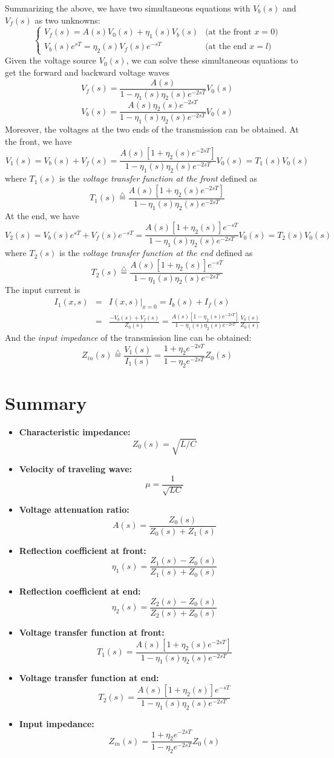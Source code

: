 Summarizing the above, we have two simultaneous equations with 
$V_b(s)$ and $V_f(s)$ as two unknowns:
\[ \left\{ \begin{array}{ll}
V_f(s)=A(s)V_0(s)+\eta_1(s)V_b(s) & \mbox{(at the front $x=0$)} \\
V_b(s)e^{sT}=\eta_2(s)V_f(s)e^{-sT} & \mbox{(at the end $x=l$)}
	\end{array} \right. \]
Given the voltage source $V_0(s)$, we can solve these simultaneous
equations to get the forward and backward voltage waves
\[ V_f(s)=\frac{A(s)}{1-\eta_1(s)\eta_2(s)e^{-2sT}}V_0(s) \]
\[ V_b(s)=\frac{A(s)\eta_2(s)e^{-2sT}}{1-\eta_1(s)\eta_2(s)e^{-2sT}}V_0(s) \]
Moreover, the voltages at the two ends of the transmission can be 
obtained. At the front, we have
\[ V_1(s)=V_b(s)+V_f(s)=\frac{A(s)[1+\eta_2(s)e^{-2sT}]}{1-\eta_1(s)\eta_2(s)e^{-2sT}}V_0(s) = T_1(s)V_0(s) \]
where $T_1(s)$ is the {\em voltage transfer function at the front} 
defined as
\[ T_1(s)\stackrel{\triangle}{=}\frac{A(s)[1+\eta_2(s)e^{-2sT}]}{1-\eta_1(s)\eta_2(s)e^{-2sT}}	\]
At the end, we have
\[  V_2(s)=V_b(s)e^{sT}+V_f(s)e^{-sT}=\frac{A(s)[1+\eta_2(s)]e^{-sT}}{1-\eta_1(s)\eta_2(s)e^{-2sT}}V_0(s) = T_2(s)V_0(s) \]
where $T_2(s)$ is the {\em voltage transfer function at the end} 
defined as
\[ T_2(s)\stackrel{\triangle}{=}\frac{A(s)[1+\eta_2(s)]e^{-sT}}{1-\eta_1(s)\eta_2(s)e^{-2sT}}	\]
The input current is
\begin{eqnarray}
I_1(x,s) &=& I(x,s)|_{x=0}=I_b(s)+I_f(s)
	\nonumber \\
 & = &\frac{-V_b(s)+V_f(s)}{Z_0(s)}=\frac{A(s)[1-\eta_2(s)e^{-2sT}]}{1-\eta_1(s)\eta_2(s)e^{-2sT}}
	\frac{V_0(s)}{Z_0(s)}	\nonumber 
\end{eqnarray}
And the {\em input impedance} of the transmission line can be 
obtained:
\[
Z_{in}(s)\stackrel{\triangle}{=}\frac{V_1(s)}{I_1(s)}=\frac{1+\eta_2e^{-2sT}}{1-\eta_2e^{-2sT}}
Z_0(s) \]

\newpage
{\large
\section*{Summary}
\begin{itemize}
\item {\bf Characteristic impedance:}
\[	Z_0(s)=\sqrt{L/C}	\]
\item {\bf Velocity of traveling wave:}
\[	\mu = \frac{1}{\sqrt{LC}}	\]
\item {\bf Voltage attenuation ratio:}
\[ A(s)=\frac{Z_0(s)}{Z_0(s)+Z_1(s)}	\]
\item {\bf Reflection coefficient at front:}
\[ \eta_1(s)=\frac{Z_1(s)-Z_0(s)}{Z_1(s)+Z_0(s)} \]
\item {\bf Reflection coefficient at end:}
\[ \eta_2(s)=\frac{Z_2(s)-Z_0(s)}{Z_2(s)+Z_0(s)} \]
\item {\bf Voltage transfer function at front:}
\[ T_1(s)=\frac{A(s)[1+\eta_2(s)e^{-2sT}]}{1-\eta_1(s)\eta_2(s)e^{-2sT}} \]
\item {\bf Voltage transfer function at end:}
\[ T_2(s)=\frac{A(s)[1+\eta_2(s)]e^{-sT}}{1-\eta_1(s)\eta_2(s)e^{-2sT}} \]
\item {\bf Input impedance:}
\[ Z_{in}(s)=\frac{1+\eta_2e^{-2sT}}{1-\eta_2e^{-2sT}}Z_0(s) \]
\end{itemize}
}
\newpage
